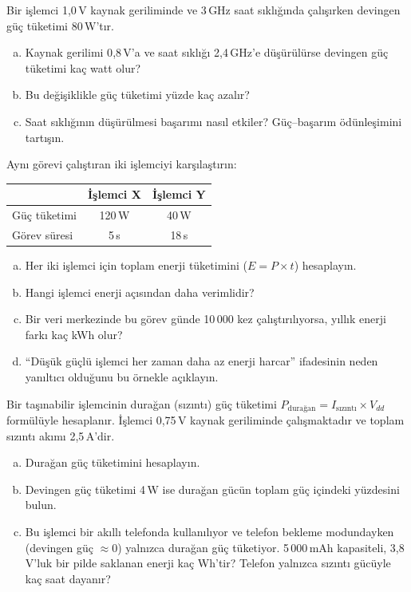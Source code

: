 
\begin{alistirma}[\orta]
Bir işlemci 1{,}0\,V kaynak geriliminde ve 3\,GHz saat sıklığında çalışırken devingen güç tüketimi 80\,W'tır.
\begin{enumerate}[(a)]
    \item Kaynak gerilimi 0{,}8\,V'a ve saat sıklığı 2{,}4\,GHz'e düşürülürse devingen güç tüketimi kaç watt olur?
    \item Bu değişiklikle güç tüketimi yüzde kaç azalır?
    \item Saat sıklığının düşürülmesi başarımı nasıl etkiler? Güç--başarım ödünleşimini tartışın.
\end{enumerate}
\end{alistirma}

\begin{alistirma}[\zor]
Aynı görevi çalıştıran iki işlemciyi karşılaştırın:

\smallskip
\begin{tabular}{@{}lcc@{}}
\toprule
 & \textbf{İşlemci X} & \textbf{İşlemci Y} \\
\midrule
Güç tüketimi & 120\,W & 40\,W \\
Görev süresi & 5\,s & 18\,s \\
\bottomrule
\end{tabular}
\smallskip

\begin{enumerate}[(a)]
    \item Her iki işlemci için toplam enerji tüketimini ($E = P \times t$) hesaplayın.
    \item Hangi işlemci enerji açısından daha verimlidir?
    \item Bir veri merkezinde bu görev günde 10\,000 kez çalıştırılıyorsa, yıllık enerji farkı kaç kWh olur?
    \item ``Düşük güçlü işlemci her zaman daha az enerji harcar'' ifadesinin neden yanıltıcı olduğunu bu örnekle açıklayın.
\end{enumerate}
\end{alistirma}

\begin{alistirma}[\orta]
Bir taşınabilir işlemcinin durağan (sızıntı) güç tüketimi $P_{\text{durağan}} = I_{\text{sızıntı}} \times V_{dd}$ formülüyle hesaplanır. İşlemci 0{,}75\,V kaynak geriliminde çalışmaktadır ve toplam sızıntı akımı 2{,}5\,A'dir.
\begin{enumerate}[(a)]
    \item Durağan güç tüketimini hesaplayın.
    \item Devingen güç tüketimi 4\,W ise durağan gücün toplam güç içindeki yüzdesini bulun.
    \item Bu işlemci bir akıllı telefonda kullanılıyor ve telefon bekleme modundayken (devingen güç $\approx 0$) yalnızca durağan güç tüketiyor. 5\,000\,mAh kapasiteli, 3{,}8\,V'luk bir pilde saklanan enerji kaç Wh'tir? Telefon yalnızca sızıntı gücüyle kaç saat dayanır?
\end{enumerate}
\end{alistirma}


